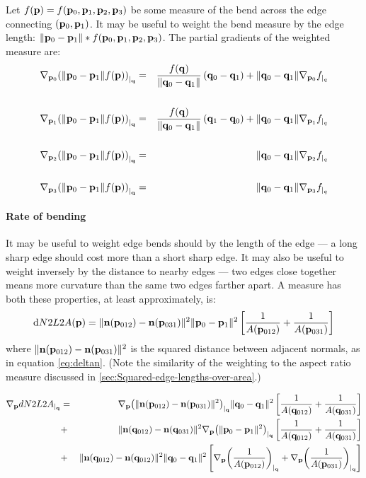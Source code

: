 Let $f({\mathbf p}) = f({\mathbf p}_0,{\mathbf p}_1,{\mathbf p}_2,{\mathbf p}_3)$ be some measure of the
bend across the edge connecting $({\mathbf p}_0,{\mathbf p}_1)$.
It may be useful to weight the bend measure by the edge length:
$\| {\mathbf p}_0 - {\mathbf p}_1 \| \ast f({\mathbf p}_0,{\mathbf p}_1,{\mathbf p}_2,{\mathbf p}_3)$.
The partial gradients of the weighted measure are:
\begin{eqnarray}
\label{eq:length_weighted_bend_gradient}
\Gc{\p_0}{\left( \|\p_0 - \p_1 \| f(\p) \right)}{\q}
& = &
\frac{f(\q)}{\|\q_0 - \q_1\|} \left( \q_0 - \q_1 \right)
+ \| \q_0 - \q_1 \| \Gc{\p_0}{f}{q}
\\
& & \nonumber \\
\Gc{\p_1}{\left( \|\p_0 - \p_1 \| f(\p) \right)}{\q}
& = &
\frac{f(\q)}{\|\q_0 - \q_1\|} \left( \q_1 - \q_0 \right)
+ \| \q_0 - \q_1 \| \Gc{\p_1}{f}{q}
\nonumber \\
& & \nonumber \\
\Gc{\p_2}{\left( \|\p_0 - \p_1 \| f(\p) \right)}{\q}
& = &
\| \q_0 - \q_1 \| \Gc{\p_2}{f}{q}
\nonumber \\
& & \nonumber \\
\Gc{\p_3}{\left( \|\p_0 - \p_1 \| f(\p) \right)}{\q}
& = &
\| \q_0 - \q_1 \| \Gc{\p_3}{f}{q}
\nonumber
\end{eqnarray}



\paragraph{Rate of bending}
\label{sec:Rate-of-bending}

It may be useful to weight edge bends should
by the length of the edge ---
a long sharp edge should cost more than a short sharp edge.
It may also be useful to weight inversely by the
distance to nearby edges --- two edges close together
means more curvature than the same two edges farther apart.
A measure has both these properties, at least approximately,
is:
\begin{equation}
{\mathrm dN2L2A ({\mathbf p}) }
=
\| {\mathbf n}({\mathbf p}_{012}) - {\mathbf n}({\mathbf p}_{031}) \|^2
\| {\mathbf p}_0 - {\mathbf p}_1 \|^2
\left[
\frac{1}{A({\mathbf p}_{012})} +
\frac{1}{A({\mathbf p}_{031})}
\right]
\end{equation}
where $\| {\mathbf n}({\mathbf p}_{012}) - {\mathbf n}({\mathbf p}_{031}) \|^2$ is the squared distance between
adjacent normals, as in equation \ref{eq:deltan}.
(Note the similarity of the weighting to the aspect ratio
measure discussed in \ref{sec:Squared-edge-lengths-over-area}.)

\begin{eqnarray}
{\mathbf \nabla}_{{\mathbf p}}{{dN2L2A}}_{\mid_{{\mathbf q}}}
& = &
{\mathbf \nabla}_{{\mathbf p}}{{\left(\| {\mathbf n}({\mathbf p}_{012}) - {\mathbf n}({\mathbf p}_{031}) \|^2 \right)}}_{\mid_{{\mathbf q}}}
\| {\mathbf q}_0 - {\mathbf q}_1 \|^2
\left[
\frac{1}{A({\mathbf q}_{012})} +
\frac{1}{A({\mathbf q}_{031})}
\right]
\\
& + &
\| {\mathbf n}({\mathbf q}_{012}) - {\mathbf n}({\mathbf q}_{031}) \|^2
{\mathbf \nabla}_{{\mathbf p}}{{\left(\| {\mathbf p}_0 - {\mathbf p}_1 \|^2\right)}}_{\mid_{{\mathbf q}}}
\left[
\frac{1}{A({\mathbf q}_{012})} +
\frac{1}{A({\mathbf q}_{031})}
\right]
\nonumber
\\
& + &
\| {\mathbf n}({\mathbf q}_{012}) - {\mathbf n}({\mathbf q}_{012}) \|^2
\| {\mathbf q}_0 - {\mathbf q}_1 \|^2
\left[
{\mathbf \nabla}_{{\mathbf p}}{{\left( \frac{1}{A({\mathbf p}_{012})} \right)}}_{\mid_{{\mathbf q}}} +
{\mathbf \nabla}_{{\mathbf p}}{{\left( \frac{1}{A({\mathbf p}_{031})} \right)}}_{\mid_{{\mathbf q}}}
\right]
\nonumber
\end{eqnarray}

